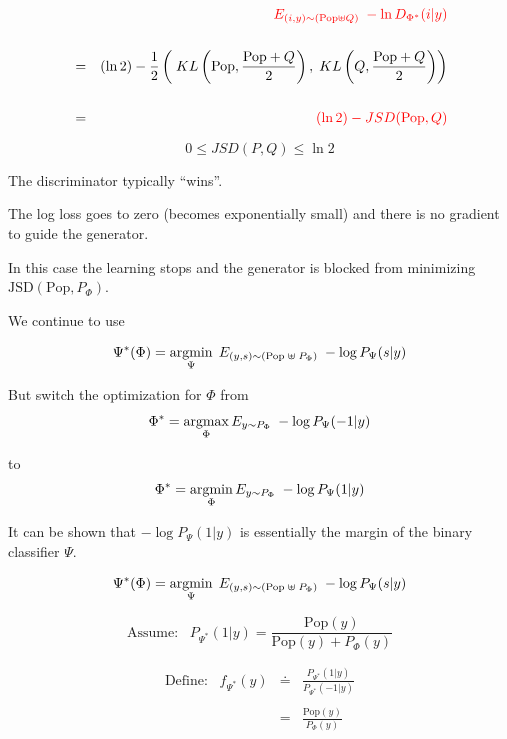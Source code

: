 {

\begin{eqnarray*}
& & {\color{red} E_{(i,y) \sim (\mathrm{Pop}\uplus Q)}\;-\ln D_{\Phi^*}(i|y)} \\
\\
& = & (\ln 2) - \frac{1}{2} \left(\;KL\left(\mathrm{Pop},\frac{\mathrm{Pop}+Q}{2}\right),\;KL\left(Q,\frac{\mathrm{Pop}+Q}{2}\right)\right) \\
\\
& = & {\color{red} (\ln 2) - JSD(\mathrm{Pop},Q)}
\end{eqnarray*}

{\color{red} $$0 \leq JSD(P,Q) \leq \ln 2$$}


The discriminator typically ``wins''.

\vfill
The log loss goes to zero (becomes exponentially small) and there is no gradient to guide the generator.

\vfill
In this case the learning stops and the generator is blocked from minimizing $\mathrm{JSD}(\mathrm{Pop},P_\Phi)$.


We continue to use

$$\Psi^*(\Phi) = \operatorname*{argmin}_\Psi \;E_{(y,s) \sim (\mathrm{Pop}\; \uplus \;P_\Phi)}\;- \log P_\Psi(s|y)$$

\vfill
But switch the optimization for $\Phi$ from
$$\Phi^* = \operatorname*{argmax}_\Phi E_{y \sim P_\Phi}\; - \log P_\Psi(-1|y)$$

to
$$\Phi^* = \operatorname*{argmin}_\Phi E_{y \sim P_\Phi}\;- \log P_\Psi(1|y)$$

\vfill
It can be shown that $- \log P_\Psi(1|y)$ is essentially the margin of the binary classifier $\Psi$.


$$\Psi^*(\Phi) = \operatorname*{argmin}_\Psi \;E_{(y,s) \sim (\mathrm{Pop}\; \uplus \;P_\Phi)}\;- \log P_\Psi(s|y)$$

\vfill
$$\mbox{Assume:}\;\;\; P_{\Psi^*}(1|y) = \frac{\mathrm{Pop}(y)}{\mathrm{Pop}(y) + P_\Phi(y)}$$

\vfill
\begin{eqnarray*}
  \mbox{Define:}\;\;\; f_{\Psi^*}(y) & \doteq & \frac{P_{\Psi^*}(1|y)}{P_{\Psi^*}(-1|y)} \\
\\
& = & \frac{\mathrm{Pop}(y)}{P_\Phi(y)}
\end{eqnarray*}

}
